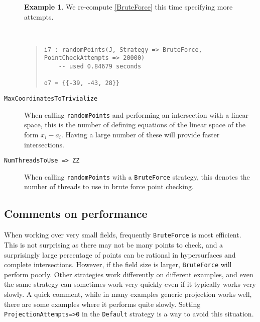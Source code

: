 \documentclass[11pt]{amsart}
\theoremstyle{definition}
\newtheorem{example}{Example}[section]
\begin{document}
\begin{description}
    \begin{example}
        We re-compute \cref{BruteForce} this time specifying more attempts.
    {{\small\color{blue}
    ~~
    \begin{quote}
\begin{verbatim}    
i7 : randomPoints(J, Strategy => BruteForce, PointCheckAttempts => 20000)
    -- used 0.84679 seconds

o7 = {{-39, -43, 28}}
    \end{verbatim}%
\end{quote}%
}}%
    \end{example}%
    \vspace{-1em}
%
    \item[\tt MaxCoordinatesToTrivialize]

    When calling {\tt randomPoints} and performing an intersection with a linear space, this is the number of defining equations of the linear space of the form $x_i - a_i$.  Having a large number of these will provide faster intersections.
    
    \item[\tt NumThreadsToUse => ZZ]

    When calling {\tt randomPoints} with a {\tt BruteForce} strategy, this denotes the number of threads to use in brute force point checking.
    \end{description}

    \subsection{Comments on performance}

    When working over very small fields, frequently {\tt BruteForce} is most efficient.  This is not surprising as there may not be many points to check, and a surprisingly large percentage of points can be rational in hypersurfaces and complete intersections.  However, if the field size is larger, {\tt BruteForce} will perform poorly.  Other strategies work differently on different examples, and even the same strategy can sometimes work very quickly even if it typically works very slowly.  A quick comment, while in many examples generic projection works well, there are some examples where it performs quite slowly.  Setting {\tt ProjectionAttempts=>0} in the {\tt Default} strategy is a way to avoid this situation.
\end{document}
